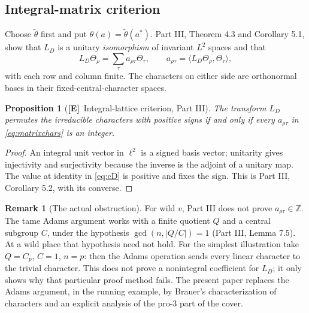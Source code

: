 \documentclass[11pt]{article}
\newcommand{\Z}{\mathbb Z}
\newcommand{\tth}{\widetilde\theta}
\newcommand{\Etag}{\textnormal{\textbf{[E]}}}
\theoremstyle{plain}
\newtheorem{proposition}[theorem]{Proposition}
\theoremstyle{definition}
\newtheorem{remark}[theorem]{Remark}
\begin{document}
\subsection{Integral-matrix criterion}\label{subsec:integral}
Choose $\tth$ first and put
$\theta(a)=\tth(a^*)$.
Part III, Theorem 4.3 and Corollary 5.1, show that $L_D$ is a
unitary \emph{isomorphism} of invariant $L^2$ spaces and that
\begin{equation}\label{eq:matrixchars}
 L_D\Theta_\rho=\sum_\tau a_{\rho\tau}\Theta_\tau,
 \qquad a_{\rho\tau}=\langle L_D\Theta_\rho,
 \Theta_\tau\rangle,
\end{equation}
with each row and column finite.  The characters on either side
are orthonormal bases in their fixed-central-character spaces.

\begin{proposition}[\Etag\ Integral-lattice criterion, Part III]\label{prop:int}
The transform $L_D$ permutes the irreducible characters with
positive signs if and only if every $a_{\rho\tau}$ in
\eqref{eq:matrixchars} is an integer.
\end{proposition}
\begin{proof}
An integral unit vector in $\ell^2$ is a signed basis vector;
unitarity gives injectivity and surjectivity because the inverse
is the adjoint of a unitary map.  The value at identity in
\eqref{eq:cD} is positive and fixes the sign.
This is Part III, Corollary 5.2, with its converse.
\end{proof}

\begin{remark}[The actual obstruction]
For wild $v$, Part III does not prove
$a_{\rho\tau}\in\Z$.  The tame Adams argument works with a
finite quotient $Q$ and a central subgroup $C$, under the
hypothesis $\gcd(n,|Q/C|)=1$ (Part III, Lemma 7.5).
At a wild place that hypothesis need not hold.  For the
simplest illustration take $Q=C_p$, $C=1$, $n=p$: then the
Adams operation sends every linear character to the trivial
character.  This does not prove a nonintegral coefficient for
$L_D$; it only shows why that particular proof method fails.
The present paper replaces the Adams argument, in the running
example, by Brauer's characterization of characters and an
explicit analysis of the pro-$3$ part of the cover.
\end{remark}
\end{document}
